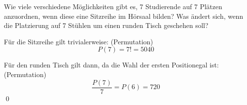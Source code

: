 \documentclass{abgabe}
\begin{document}
\begin{questions}
    \question
    Wie viele verschiedene Möglichkeiten gibt es, 7 Studierende auf 7 Plätzen anzuordnen, wenn diese eine Sitzreihe im Hörsaal bilden?
    Was ändert sich, wenn die Platzierung auf 7 Stühlen um einen runden Tisch geschehen soll?
    \begin{solution}
        Für die Sitzreihe gilt trivialerweise: (Permutation)
        \[
            P(7) = 7! = \num{5040}  
        \]

        Für den runden Tisch gilt dann, da die Wahl der \glqq ersten Position\grqq egal ist: (Permutation)
        \[
            \frac{P(7)}{7} = P(6) = 720
        \]\qed
    \end{solution}
\end{questions}
\end{document}

